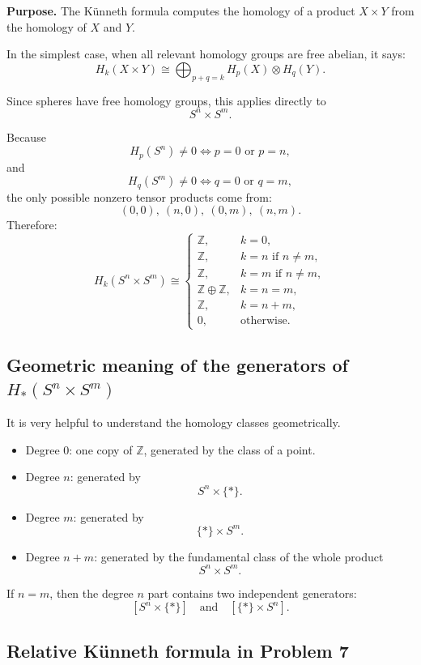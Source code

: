 \documentclass[12pt,a4paper]{article}
\theoremstyle{notespace}
\begin{document}
\textbf{Purpose.}
The K\"unneth formula computes the homology of a product \(X\times Y\) from the homology of \(X\) and \(Y\).

In the simplest case, when all relevant homology groups are free abelian, it says:
\[
H_k(X\times Y)\cong \bigoplus_{p+q=k} H_p(X)\otimes H_q(Y).
\]

Since spheres have free homology groups, this applies directly to
\[
S^n\times S^m.
\]

Because
\[
H_p(S^n)\neq 0 \iff p=0 \text{ or } p=n,
\]
and
\[
H_q(S^m)\neq 0 \iff q=0 \text{ or } q=m,
\]
the only possible nonzero tensor products come from:
\[
(0,0),\ (n,0),\ (0,m),\ (n,m).
\]
Therefore:
\[
H_k(S^n\times S^m)\cong
\begin{cases}
	\mathbb Z, & k=0,\\
	\mathbb Z, & k=n \text{ if } n\neq m,\\
	\mathbb Z, & k=m \text{ if } n\neq m,\\
	\mathbb Z\oplus \mathbb Z, & k=n=m,\\
	\mathbb Z, & k=n+m,\\
	0, & \text{otherwise}.
\end{cases}
\]

\subsection{Geometric meaning of the generators of \(H_*(S^n\times S^m)\)}

It is very helpful to understand the homology classes geometrically.

\begin{itemize}
	\item Degree \(0\): one copy of \(\mathbb Z\), generated by the class of a point.
	\item Degree \(n\): generated by
	\[
	S^n\times \{\ast\}.
	\]
	\item Degree \(m\): generated by
	\[
	\{\ast\}\times S^m.
	\]
	\item Degree \(n+m\): generated by the fundamental class of the whole product
	\[
	S^n\times S^m.
	\]
\end{itemize}

If \(n=m\), then the degree \(n\) part contains two independent generators:
\[
[S^n\times \{\ast\}]
\quad\text{and}\quad
[\{\ast\}\times S^n].
\]

\subsection{Relative K\"unneth formula in Problem 7}
\end{document}
